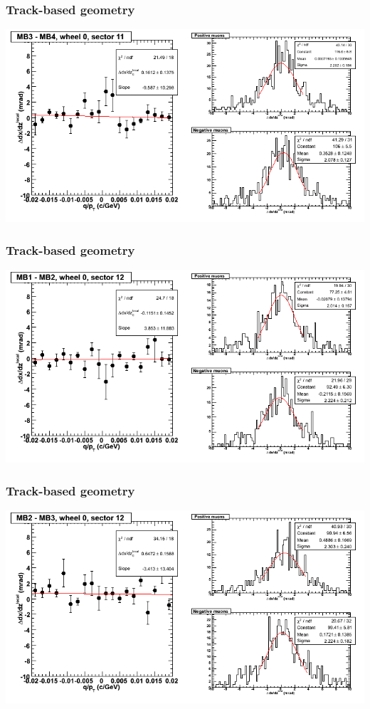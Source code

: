 \documentclass[compress]{beamer}
\begin{document}
\begin{frame}
\frametitle{Track-based geometry}
\includegraphics[width=\linewidth]{NOV4_segdiffs/dt13_slope_C_11_34.png}
\end{frame}

\begin{frame}
\frametitle{Track-based geometry}
\includegraphics[width=\linewidth]{NOV4_segdiffs/dt13_slope_C_12_12.png}
\end{frame}

\begin{frame}
\frametitle{Track-based geometry}
\includegraphics[width=\linewidth]{NOV4_segdiffs/dt13_slope_C_12_23.png}
\end{frame}
\end{document}
